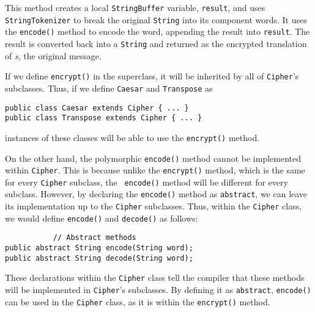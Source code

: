 \noindent This method creates a local {\tt StringBuffer} variable,
{\tt result}, and uses {\tt StringTokenizer} to break the original
{\tt String} into its component words.  It uses the {\tt encode()} method to
encode the word, appending the result into {\tt result}. The result is
converted back into a {\tt String} and returned as the encrypted
translation of {\it s}, the original message.

If we define {\tt encrypt()} in the superclass, it will be inherited
by all of {\tt Cipher}'s subclasses.  Thus, if we define {\tt Caesar}
and {\tt Transpose} as

\begin{jjjlisting}
\begin{lstlisting}
public class Caesar extends Cipher { ... }
public class Transpose extends Cipher { ... }
\end{lstlisting}
\end{jjjlisting}

\noindent instances of these classes will be able to use
the {\tt encrypt()} method.

On the other hand, the polymorphic {\tt encode()} method cannot be
implemented
within {\tt Cipher}. This is because unlike the {\tt encrypt()}
method, which is the same for every {\tt Cipher} subclass, the {\tt
encode()} method will be different for every subclass.  However, by
declaring the {\tt encode()} method as {\tt abstract}, we can leave
its implementation up to the {\tt Cipher} subclasses. Thus, within the
{\tt Cipher} class, we would define {\tt encode()} and {\tt decode()}
as follows:

\begin{jjjlisting}
\begin{lstlisting}
           // Abstract methods
public abstract String encode(String word); 
public abstract String decode(String word);
\end{lstlisting}
\end{jjjlisting}

\noindent These declarations within the {\tt Cipher} class tell the
compiler that these methods will be implemented in {\tt Cipher}'s
subclasses. By defining it as {\tt abstract}, {\tt encode()} can be
used in the {\tt Cipher} class, as it is within the {\tt encrypt()}
method.

